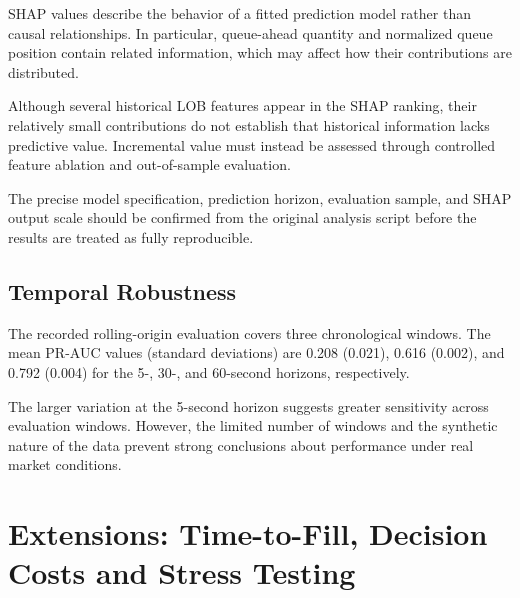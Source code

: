 \documentclass[11pt,a4paper]{article}
\begin{document}
SHAP values describe the behavior of a fitted
prediction model rather than causal relationships.
In particular, queue-ahead quantity and normalized
queue position contain related information, which
may affect how their contributions are distributed.

Although several historical LOB features appear
in the SHAP ranking, their relatively small
contributions do not establish that historical
information lacks predictive value. Incremental
value must instead be assessed through controlled
feature ablation and out-of-sample evaluation.

The precise model specification, prediction
horizon, evaluation sample, and SHAP output
scale should be confirmed from the original
analysis script before the results are treated
as fully reproducible.

\subsection{Temporal Robustness}

The recorded rolling-origin evaluation covers
three chronological windows. The mean PR-AUC
values (standard deviations) are 0.208 (0.021),
0.616 (0.002), and 0.792 (0.004) for the
5-, 30-, and 60-second horizons, respectively.

The larger variation at the 5-second horizon
suggests greater sensitivity across evaluation
windows. However, the limited number of windows
and the synthetic nature of the data prevent
strong conclusions about performance under
real market conditions.

\FloatBarrier

\section{Extensions: Time-to-Fill, Decision Costs and Stress Testing}
\end{document}
